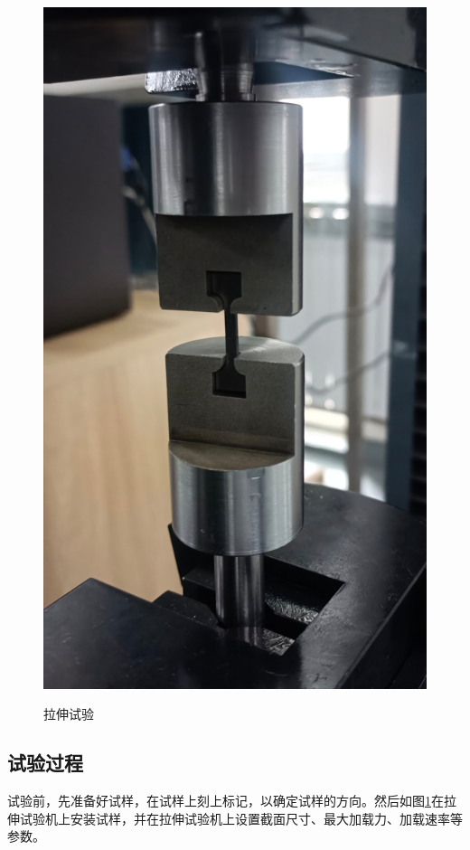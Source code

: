 \begin{figure}[h!]
{		\includegraphics[scale=0.4]{pic/拉伸试验}}
	\caption{拉伸试验}
	\label{fig:拉伸试验}
\end{figure}
\subsection{试验过程}
试验前，先准备好试样，在试样上刻上标记，以确定试样的方向。然后如图\ref{fig:拉伸试验}在拉伸试验机上安装试样，并在拉伸试验机上设置截面尺寸、最大加载力、加载速率等参数。

